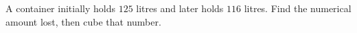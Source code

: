A container initially holds $125$ litres and later holds $116$ litres. Find the numerical amount lost, then cube that number.

